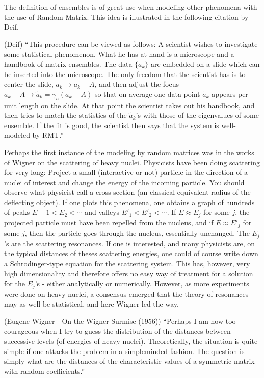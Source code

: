 The definition of ensembles is of great use when modeling other phenomena with the use of Random Matrix. This idea is illustrated in the following citation by Deif.

\begin{sic}
	(Deif)
	\enquote{This procedure can  be viewed as follows: A scientist wishes to investigate some statistical phenomenon. What he has at hand is a microscope and a handbook of matrix ensembles. The data $\{a_k\}$ are embedded on a slide which can be inserted into the microscope. The only freedom that the scientist has is to center the slide, $a_k \rightarrow a_k - A$, and then adjust the focus $a_k - A \rightarrow \tilde{a}_k = \gamma_a(a_k - A)$ so that on average one data point $\tilde{a}_k$ appears per unit length on the slide. At that point the scientist takes out his handbook, and then tries to match the statistics of the $\tilde{a}_k$’s with those of the eigenvalues of some ensemble. If the fit is good, the scientist then says that the system is well-modeled by RMT.}
\end{sic}

Perhaps the first instance of the modeling by random matrices was in the works of Wigner on the scattering of heavy nuclei. Physicists have been doing scattering for very long: Project a small (interactive or not) particle in the direction of a nuclei of interest and change the energy of the incoming particle. You should observe what physicist call a cross-section (an classical equivalent radius of the deflecting object). If one plots this phenomena, one obtains a graph of hundreds of peaks $E-1 < E_2 < \cdots$  and valleys $E'_1 < E'_2 < \cdots $. If $E \approx E_j$ for some $j$, the projected particle must have been repelled from the nucleus, and if $E \approx E'_j$ for some $j$, then the particle goes through the nucleus, essentially unchanged. The $E_j$’s are the scattering resonances. If one is interested, and many physicists are, on the typical distances of theses scattering energies, one could of course write down a Schrodinger-type equation for the scattering system. This has, however, very high dimensionality and therefore offers no easy way of treatment for a solution for the $E_j$’s - either analytically or numerically. However, as more experiments were done on heavy nuclei, a consensus emerged that the theory of resonances may as well be statistical, and here Wigner led the way.

\begin{sic}
	(Eugene Wigner - On the Wigner Surmise (1956))
	“Perhaps I am now too courageous when I try to guess the distribution of the distances between successive levels (of energies of heavy nuclei). Theoretically, the situation is quite simple if one attacks the problem in a simpleminded fashion. The question is simply what are the distances of the characteristic values of a symmetric matrix with random coefficients.” 
\end{sic}

